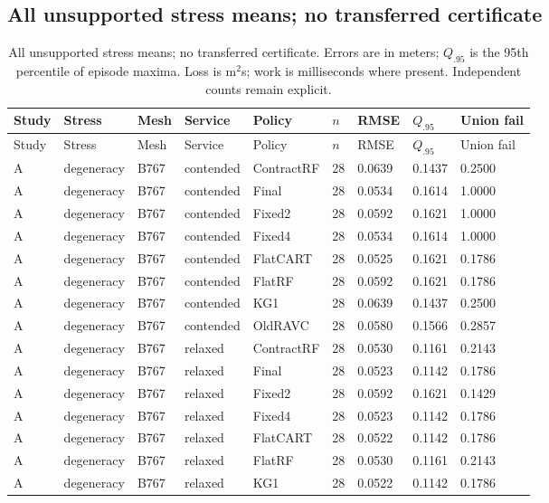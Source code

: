 \subsection{All unsupported stress means; no transferred certificate}
\scriptsize\setlength{\tabcolsep}{3pt}\begin{longtable}{@{}lllllllll@{}}
\caption{All unsupported stress means; no transferred certificate. Errors are in meters; $Q_{.95}$ is the 95th percentile of episode maxima. Loss is m$^2$s; work is milliseconds where present. Independent counts remain explicit.}\\\toprule
Study & Stress & Mesh & Service & Policy & $n$ & RMSE & $Q_{.95}$ & Union fail\\\midrule\endfirsthead
\toprule
Study & Stress & Mesh & Service & Policy & $n$ & RMSE & $Q_{.95}$ & Union fail\\\midrule\endhead
A & degeneracy & B767 & contended & ContractRF & 28 & 0.0639 & 0.1437 & 0.2500\\
A & degeneracy & B767 & contended & Final & 28 & 0.0534 & 0.1614 & 1.0000\\
A & degeneracy & B767 & contended & Fixed2 & 28 & 0.0592 & 0.1621 & 1.0000\\
A & degeneracy & B767 & contended & Fixed4 & 28 & 0.0534 & 0.1614 & 1.0000\\
A & degeneracy & B767 & contended & FlatCART & 28 & 0.0525 & 0.1621 & 0.1786\\
A & degeneracy & B767 & contended & FlatRF & 28 & 0.0592 & 0.1621 & 0.1786\\
A & degeneracy & B767 & contended & KG1 & 28 & 0.0639 & 0.1437 & 0.2500\\
A & degeneracy & B767 & contended & OldRAVC & 28 & 0.0580 & 0.1566 & 0.2857\\
A & degeneracy & B767 & relaxed & ContractRF & 28 & 0.0530 & 0.1161 & 0.2143\\
A & degeneracy & B767 & relaxed & Final & 28 & 0.0523 & 0.1142 & 0.1786\\
A & degeneracy & B767 & relaxed & Fixed2 & 28 & 0.0592 & 0.1621 & 0.1429\\
A & degeneracy & B767 & relaxed & Fixed4 & 28 & 0.0523 & 0.1142 & 0.1786\\
A & degeneracy & B767 & relaxed & FlatCART & 28 & 0.0522 & 0.1142 & 0.1786\\
A & degeneracy & B767 & relaxed & FlatRF & 28 & 0.0530 & 0.1161 & 0.2143\\
A & degeneracy & B767 & relaxed & KG1 & 28 & 0.0522 & 0.1142 & 0.1786\\

\end{longtable}
